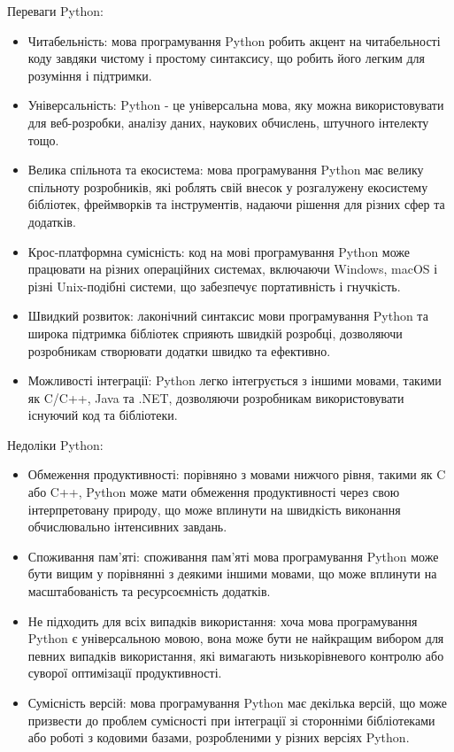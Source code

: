 Переваги Python:
\begin{itemize}
    \item Читабельність: мова програмування Python робить акцент на читабельності коду завдяки чистому і простому синтаксису, що робить його легким для розуміння і підтримки.
    \item Універсальність: Python - це універсальна мова, яку можна використовувати для веб-розробки, аналізу даних, наукових обчислень, штучного інтелекту тощо.
    \item Велика спільнота та екосистема: мова програмування Python має велику спільноту розробників, які роблять свій внесок у розгалужену екосистему бібліотек, фреймворків та інструментів, надаючи рішення для різних сфер та додатків.
    \item Крос-платформна сумісність: код на мові програмування Python може працювати на різних операційних системах, включаючи Windows, macOS і різні Unix-подібні системи, що забезпечує портативність і гнучкість.
    \item Швидкий розвиток: лаконічний синтаксис мови програмування Python та широка підтримка бібліотек сприяють швидкій розробці, дозволяючи розробникам створювати додатки швидко та ефективно.
    \item Можливості інтеграції: Python легко інтегрується з іншими мовами, такими як C/C++, Java та .NET, дозволяючи розробникам використовувати існуючий код та бібліотеки.
\end{itemize}

Недоліки Python:
\begin{itemize}
    \item Обмеження продуктивності: порівняно з мовами нижчого рівня, такими як C або C++, Python може мати обмеження продуктивності через свою інтерпретовану природу, що може вплинути на швидкість виконання обчислювально інтенсивних завдань.
    \item Споживання пам'яті: споживання пам'яті мова програмування Python може бути вищим у порівнянні з деякими іншими мовами, що може вплинути на масштабованість та ресурсоємність додатків.
    \item Не підходить для всіх випадків використання: хоча мова програмування Python є універсальною мовою, вона може бути не найкращим вибором для певних випадків використання, які вимагають низькорівневого контролю або суворої оптимізації продуктивності.
    \item Сумісність версій: мова програмування Python має декілька версій, що може призвести до проблем сумісності при інтеграції зі сторонніми бібліотеками або роботі з кодовими базами, розробленими у різних версіях Python.
\end{itemize}
